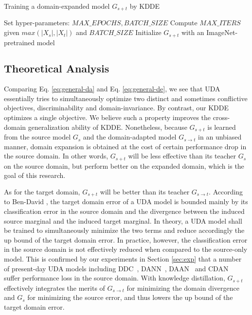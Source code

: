 \begin{algorithm}
\caption{Training a domain-expanded model $G_{s+t}$ by KDDE}
\label{alg:kdde}
Set hyper-parameters: $MAX\_EPOCHS, BATCH\_SIZE$\;
Compute $MAX\_ITERS$ given $max(|X_s|,|X_t|)$ and  $BATCH\_SIZE$\;
Initialize {$G_{s+t}$} with an ImageNet-pretrained model\;
\end{algorithm}
 
\subsection{Theoretical Analysis}

Comparing Eq. \ref{eq:general-da} and Eq. \ref{eq:general-de}, we see that UDA essentially tries to simultaneously optimize two distinct and sometimes conflictive objectives, \ie discriminability and domain-invariance. By contrast, our KDDE optimizes a single objective. We believe such a property improves the cross-domain generalization ability of KDDE. Nonetheless, because $G_{s+t}$ is learned from the source model $G_s$ and the domain-adapted model $G_{s\rightarrow t}$ in an unbiased manner, domain expansion is obtained at the cost of certain performance drop in the source domain. In other words, $G_{s+t}$ will be less effective than its teacher $G_{s}$ on the source domain, but perform better on the expanded domain, which is the goal of this research.

As for the target domain, $G_{s+t}$ will be better than its teacher $G_{s\rightarrow t}$. According to Ben-David \etal \cite{ben2007analysis}, the target domain error of a UDA model is bounded mainly by its classification error in the source domain and the divergence between the induced source marginal and the induced target marginal. In theory, a UDA model shall be trained to simultaneously minimize the two terms and reduce accordingly the up bound of the target domain error. In practice, however, the classification error in the source domain is not effectively reduced when compared to the source-only model. This is confirmed by our experiments in Section \ref{sec:exp} that a number of present-day UDA models including DDC~\cite{ddc}, DANN~\cite{jmlr16-dann}, DAAN~\cite{icdm19-daan} and CDAN~\cite{nips18-cdan} suffer performance loss in the source domain. With knowledge distillation, $G_{s+t}$ effectively integrates the merits of $G_{s\rightarrow t}$ for minimizing the domain divergence and $G_s$ for minimizing the source error, and thus lowers the up bound of the target domain error. 

